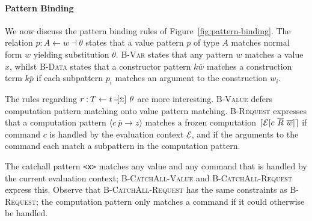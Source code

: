 \documentclass[msc,deptreport,cs]{infthesis} %
\newcommand{\code}[1]{\lstinline{#1}}
\DeclarePairedDelimiter{\ceil}{\lceil}{\rceil}
\newcommand{\many}{\overline}
\newcommand{\bindbase}[4]{{#3} \mathbin{:} {#2} \mathbin{#1} {#4}}
\newcommand{\sigs}{\Sigma}
\newcommand{\effin}[1]{\langle {#1} \rangle}
\newcommand{\EC}{\mathcal{E}}
\newcommand{\venv}{\theta}
\newcommand{\freeze}{\ceil}
\newcommand{\sigyields}[1]
           {\mathbin{\text{-\!-\!}[{\text{\scriptsize ${#1}$}}]\,}}
\newcommand{\bindsv}[4]{\bindbase{\dashv}{#2 \leftarrow #3}{#1}{#4}}
\newcommand{\bindsc}[5]{\bindbase{\sigyields{#4}}{#2 \leftarrow #3}{#1}{#5}}
\begin{document}
\paragraph*{Pattern Binding}

We now discuss the pattern binding rules of Figure~\ref{fig:pattern-binding}.
The relation $\bindsv{p}{A}{w}{\venv}$ states that a value pattern $p$ of type $A$ matches normal form $w$ yielding substitution $\venv$. \textsc{B-Var} states that any pattern $w$ matches a value $x$, whilst \textsc{B-Data} states that a constructor pattern $k \many{w}$ matches a construction term $k \many{p}$ if each subpattern $p_{i}$ matches an argument to the construction $w_{i}$.


The rules regarding $\bindsc{r}{T}{t}{\sigs}{\venv}$ are more interesting. \textsc{B-Value} defers computation pattern matching onto value pattern matching. \textsc{B-Request} expresses that a computation pattern $\effin{c~\many{p} \to z}$ matches a frozen computation $\freeze{\EC[c~\many{R}~\many{w}]}$ if command $c$ is handled by the evaluation context $\EC$, and if the arguments to the command each match a subpattern in the computation pattern.

The catchall pattern \code{<x>} matches any value and any command that is handled by the current evaluation context; \textsc{B-CatchAll-Value} and \textsc{B-CatchAll-Request} express this. Observe that \textsc{B-CatchAll-Request} has the same constraints as \textsc{B-Request}; the computation pattern only matches a command if it could otherwise be handled.
\end{document}
